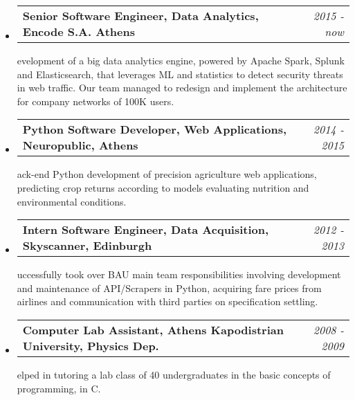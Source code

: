 \documentclass[10pt]{article}
\makeatletter
\newenvironment{position}[4]
{\filbreak
\item
  \begin{tabular*}{6.5in}{l@{\extracolsep{\fill}}r}
    \textbf{#1} & \textit{#2}\\
  \end{tabular*}
  
  \begin{itemize}
    \setlength{\parskip}{-1pt}
  } {\end{itemize}}
\newenvironment{region}[1]
{{\large \textbf{#1}}
  \begin{itemize}
  }{\end{itemize}}
\makeatother
\begin{document}
\begin{region}{Employment}

  \begin{position}{Senior Software Engineer, Data Analytics, Encode S.A. Athens}
  {2015 - now}
  
  \item Development of a big data analytics engine, powered by Apache Spark, Splunk and Elasticsearch, that leverages ML and statistics to detect security threats in web traffic. Our team managed to redesign and implement the architecture for company networks of 100K users.
  \end{position}
  
  \begin{position}{Python Software Developer, Web Applications, Neuropublic, Athens}
    {2014 - 2015}

  \item Back-end Python development of precision agriculture web applications, predicting crop returns according to models evaluating nutrition and environmental conditions.
  \end{position}

  \begin{position}{Intern Software Engineer, Data Acquisition, Skyscanner, Edinburgh}
    {2012 - 2013}
    
  \item Successfully took over BAU main team responsibilities involving development and maintenance of API/Scrapers in Python, acquiring fare prices from airlines and communication with third parties on specification settling.
  \end{position}

  \begin{position}{Computer Lab Assistant,
Athens Kapodistrian University, Physics Dep.}
    {2008 - 2009}
    
  \item Helped in tutoring a lab class of 40 undergraduates in the basic concepts of programming, in C.
  \end{position}
    
\end{region}   
 
\end{document}
